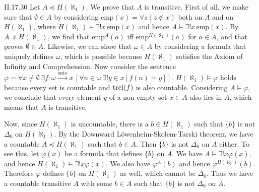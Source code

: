 \documentclass[12pt]{article}
\begin{document}
\begin{customthm}{II.17.30}
  Let $A\preccurlyeq H(\aleph_1)$. We prove that $A$ is transitive. First of all, we make sure that $\emptyset\in A$ by considering $\mathrm{emp}(x)=\forall z(z\not\in x)$ both on $A$ and on $H(\aleph_1)$, where $H(\aleph_1)\models\exists!x\,\mathrm{emp}(x)$ and hence $A\models\exists!x\,\mathrm{emp}(x)$. By $A\preccurlyeq H(\aleph_1)$, we find that $\mathrm{emp}^A(a)$ iff $\mathrm{emp}^{H(\aleph_1)}(a)$ for $a\in A$, and that proves $\emptyset\in A$. Likewise, we can show that $\omega\in A$ by considering a formula that uniquely defines $\omega$, which is possible because $H(\aleph_1)$ satisfies the Axiom of Infinity and Comprehension. Now consider the sentence $\varphi=\forall x\neq\emptyset\,\exists f:\omega\xrightarrow{\textrm{onto}}x\,[\forall n\in\omega\,\exists!y\in x[f(n)=y]]$. $H(\aleph_1)\models\varphi$ holds because every set is countable and $\mathop{\mathrm{trcl}}(f)$ is also countable. Considering $A\models\varphi$, we conclude that every element $y$ of a non-empty set $x\in A$ also lies in $A$, which means that $A$ is transitive.

  Now, since $H(\aleph_1)$ is uncountable, there is a $b\in H(\aleph_1)$ such that $\{b\}$ is not $\Delta_0$ on $H(\aleph_1)$. By the Downward Löwenheim-Skolem-Tarski theorem, we have a countable $A\preccurlyeq H(\aleph_1)$ such that $b\in A$. Then $\{b\}$ is not $\Delta_0$ on $A$ either. To see this, let $\varphi(x)$ be a formula that defines $\{b\}$ on $A$. We have $A\models\exists!x\varphi(x)$, and hence $H(\aleph_1)\models\exists!x\varphi(x)$. We also have $\varphi^A(b)$ and hence $\varphi^{H(\aleph_1)}(b)$. Therefore $\varphi$ defines $\{b\}$ on $H(\aleph_1)$ as well, which cannot be $\Delta_0$. Thus we have a countable transitive $A$ with some $b\in A$ such that $\{b\}$ is not $\Delta_0$ on $A$.
\end{customthm}
\end{document}
